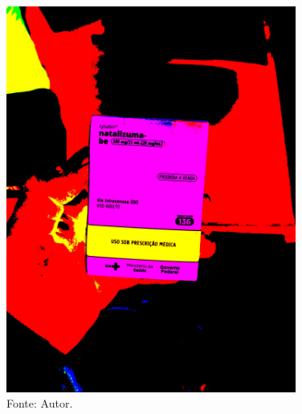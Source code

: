 \begin{frame}
\begin{columns}
\begin{column}{0.5\textwidth}
\begin{figure}
				\includegraphics[width=0.85\textwidth]{../pictures/tysabri_cmyk_thresh_boxes.jpg}
				\caption*{Fonte: Autor.}
			\end{figure}
		\end{column}
	\end{columns}
\end{frame}

